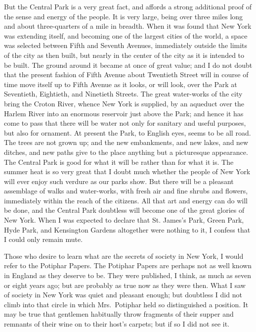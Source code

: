 But the Central Park is a very great fact, and affords a strong
additional proof of the sense and energy of the people.  It is very
large, being over three miles long and about three-quarters of a
mile in breadth.  When it was found that New York was extending
itself, and becoming one of the largest cities of the world, a
space was selected between Fifth and Seventh Avenues, immediately
outside the limits of the city as then built, but nearly in the
center of the city as it is intended to be built.  The ground
around it became at once of great value; and I do not doubt that
the present fashion of Fifth Avenue about Twentieth Street will in
course of time move itself up to Fifth Avenue as it looks, or will
look, over the Park at Seventieth, Eightieth, and Ninetieth
Streets.  The great water-works of the city bring the Croton River,
whence New York is supplied, by an aqueduct over the Harlem River
into an enormous reservoir just above the Park; and hence it has
come to pass that there will be water not only for sanitary and
useful purposes, but also for ornament.  At present the Park, to
English eyes, seems to be all road.  The trees are not grown up;
and the new embankments, and new lakes, and new ditches, and new
paths give to the place anything but a picturesque appearance.  The
Central Park is good for what it will be rather than for what it
is.  The summer heat is so very great that I doubt much whether the
people of New York will ever enjoy such verdure as our parks show.
But there will be a pleasant assemblage of walks and water-works,
with fresh air and fine shrubs and flowers, immediately within the
reach of the citizens.  All that art and energy can do will be
done, and the Central Park doubtless will become one of the great
glories of New York.  When I was expected to declare that St.
James's Park, Green Park, Hyde Park, and Kensington Gardens
altogether were nothing to it, I confess that I could only remain
mute.

Those who desire to learn what are the secrets of society in New
York, I would refer to the Potiphar Papers.  The Potiphar Papers
are perhaps not as well known in England as they deserve to be.
They were published, I think, as much as seven or eight years ago;
but are probably as true now as they were then.  What I saw of
society in New York was quiet and pleasant enough; but doubtless I
did not climb into that circle in which Mrs.\ Potiphar held so
distinguished a position.  It may be true that gentlemen habitually
throw fragments of their supper and remnants of their wine on to
their host's carpets; but if so I did not see it.

